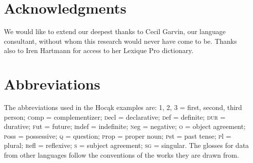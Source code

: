 \documentclass[output=paper]{LSP/langsci}
\begin{document}
\section*{Acknowledgments}
We would like to extend our deepest thanks to Cecil Garvin, our language consultant, without whom this research would never have come to be. Thanks also to Iren Hartmann for access to her Lexique Pro dictionary.

\section*{Abbreviations}
The abbreviations used in the Hocąk examples are: 1, 2, 3 = first, second, third person; {\textsc comp} = complementizer; {\textsc decl} = declarative; {\textsc def} = definite; \textsc{dur} = durative; {\textsc fut} = future; {\textsc indef} = indefinite; {\textsc neg} = negative; {\textsc o} = object agreement; {\textsc poss} = possessive; \textsc{q} = question; {\textsc prop} = proper noun; {\textsc pst} = past tense; {\textsc pl} = plural; {\textsc refl} = reflexive; {\textsc s} = subject agreement; \textsc{sg} = singular. The glosses for data from other languages follow the conventions of the works they are drawn from.
 
 

\printbibliography[heading=subbibliography,notkeyword=this]
\end{document}
